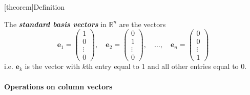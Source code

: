 \documentclass[12pt]{report}
\theoremstyle{definition}
\begin{document}
[theorem]{Definition}
\begin{standard basis vector}
    The \textbf{\emph{standard basis vectors}} in $\mathbb{R}^{n}$ are the vectors\[
        \mathbf{e}_1 = \begin{pmatrix}
                1\\
                0\\
                \vdots\\
                0
        \end{pmatrix}, \quad
        \mathbf{e}_2 = \begin{pmatrix}
                0\\
                1\\
                \vdots\\
                0
        \end{pmatrix}, \quad \ldots, \quad
        \mathbf{e}_n = \begin{pmatrix}
                0\\
                0\\
                \vdots\\
                1
        \end{pmatrix}
    \]
    i.e. $\mathbf{e}_k$ is the vector with $k$th entry equal to 1 and all other entries equal to 0.
\end{standard basis vector}

\paragraph{Operations on column vectors}
\end{document}
